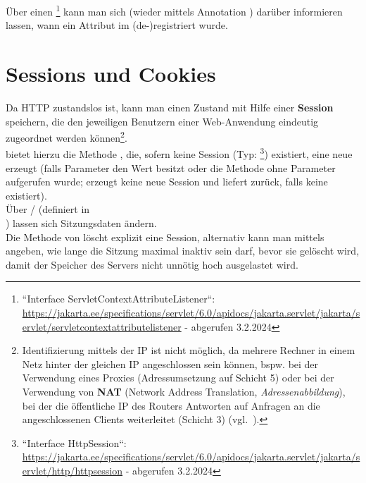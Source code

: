 \noindent
Über einen \footnote{
    ``Interface ServletContextAttributeListener``: \url{https://jakarta.ee/specifications/servlet/6.0/apidocs/jakarta.servlet/jakarta/servlet/servletcontextattributelistener} - abgerufen 3.2.2024
} kann man sich (wieder mittels Annotation ) darüber informieren lassen, wann ein Attribut im  (de-)registriert wurde.

\section{Sessions und Cookies}

Da HTTP zustandslos ist, kann man einen Zustand mit Hilfe einer \textbf{Session} speichern, die den jeweiligen Benutzern einer Web-Anwendung eindeutig zugeordnet werden können\footnote{
Identifizierung mittels der IP ist nicht möglich, da mehrere Rechner in einem Netz hinter der gleichen IP angeschlossen sein können, bspw. bei der Verwendung eines Proxies (Adressumsetzung auf Schicht 5) oder bei der Verwendung von \textbf{NAT} (Network Address Translation, \textit{Adressenabbildung}), bei der die öffentliche IP des Routers Antworten auf Anfragen an die angeschlossenen Clients weiterleitet (Schicht 3) (vgl.~\cite[425]{Oec22}).
}.\\

\noindent
{} bietet hierzu die Methode , die, sofern keine Session (Typ: \footnote{
``Interface HttpSession``: \url{https://jakarta.ee/specifications/servlet/6.0/apidocs/jakarta.servlet/jakarta/servlet/http/httpsession} - abgerufen 3.2.2024
}) existiert, eine neue erzeugt (falls Parameter  den Wert  besitzt oder die Methode ohne Parameter aufgerufen wurde;  erzeugt keine neue Session und liefert  zurück, falls keine existiert).\\

\noindent
Über  /   (definiert in\\ ) lassen sich Sitzungsdaten ändern.\\

\noindent
Die Methode  von  löscht explizit eine Session, alternativ kann man mittels  angeben, wie lange die Sitzung maximal inaktiv sein darf, bevor sie gelöscht wird, damit der Speicher des Servers nicht unnötig hoch ausgelastet wird.

